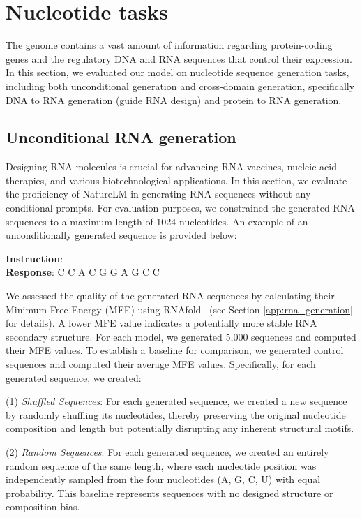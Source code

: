 \section{Nucleotide tasks}\label{sec:nucleotide}

The genome contains a vast amount of information regarding protein-coding genes and the regulatory DNA and RNA sequences that control their expression. In this section, we evaluated our model on nucleotide sequence generation tasks, including both unconditional generation and cross-domain generation, specifically DNA to RNA generation (guide RNA design) and protein to RNA generation.

\subsection{Unconditional RNA generation}\label{sec:unconditional_rna_generation}
Designing RNA molecules is crucial for advancing RNA vaccines, nucleic acid therapies, and various biotechnological applications. In this section, we evaluate the proficiency of NatureLM in generating RNA sequences without any conditional prompts. For evaluation purposes, we constrained the generated RNA sequences to a maximum length of 1024 nucleotides. An example of an unconditionally generated sequence is provided below:
\begin{example}
\noindent\textbf{Instruction}: \rna{} \\
\noindent\textbf{Response}: \rna{} C C A C G G A G C C \erna{}
\end{example}

We assessed the quality of the generated RNA sequences by calculating their Minimum Free Energy (MFE) using RNAfold~\cite{Lorenz2011} (see Section \ref{app:rna_generation} for details). A lower MFE value indicates a potentially more stable RNA secondary structure. For each model, we generated 5,000 sequences and computed their MFE values. To establish a baseline for comparison, we generated control sequences and computed their average MFE values. Specifically, for each generated sequence, we created:

\noindent(1) {\em Shuffled Sequences}: For each generated sequence, we created a new sequence by randomly shuffling its nucleotides, thereby preserving the original nucleotide composition and length but potentially disrupting any inherent structural motifs. 

\noindent(2) {\em Random Sequences}: For each generated sequence, we created an entirely random sequence of the same length, where each nucleotide position was independently sampled from the four nucleotides (A, G, C, U) with equal probability. This baseline represents sequences with no designed structure or composition bias.

